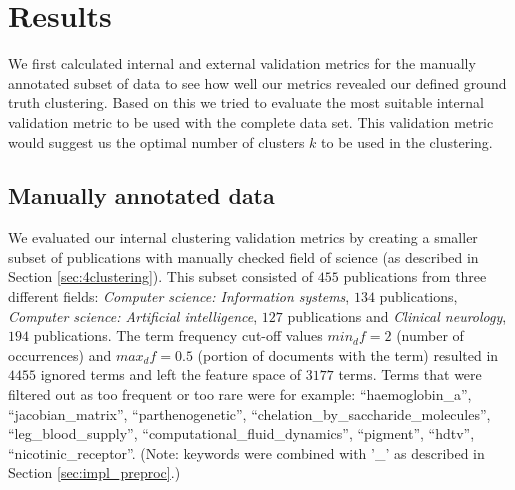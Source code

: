 \chapter{Results}
\label{chapter:results}

We first calculated internal and external validation metrics for 
the manually annotated subset of data to see how well our metrics 
revealed our defined ground truth clustering. Based on this we tried 
to evaluate the most suitable internal validation metric to be used 
with the complete data set. This validation metric would suggest us
the optimal number of clusters $k$ to be used in the clustering.

\section{Manually annotated data}
We evaluated our internal clustering validation metrics by 
creating a smaller subset of publications with manually
checked field of science (as described in Section 
\ref{sec:4clustering}). This subset consisted of 
$455$ publications from three different fields:
\emph{Computer science: Information systems}, $134$ publications,
\emph{Computer science: Artificial intelligence}, $127$ publications
and \emph{Clinical neurology}, $194$ publications.
The term frequency cut-off values $min_df=2$ (number of occurrences) 
and $max_df=0.5$ (portion of documents with the term) resulted
in $4455$ ignored terms and left the feature space of $3177$ terms. 
Terms that were filtered out as too frequent or too rare were for 
example: 
``haemoglobin\_a'', ``jacobian\_matrix'', 
``parthenogenetic'', ``chelation\_by\_saccharide\_molecules'', 
``leg\_blood\_supply'', ``computational\_fluid\_dynamics'', 
``pigment'', ``hdtv'', ``nicotinic\_receptor''. 
\linebreak
(Note: keywords were
combined with '\_' as described in Section \ref{sec:impl_preproc}.)


